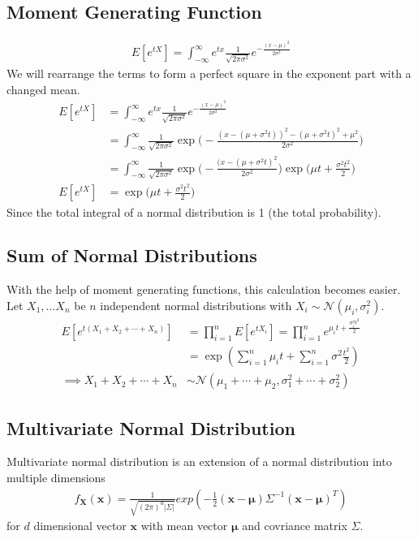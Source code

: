 \documentclass[../../probability-notes.tex]{subfiles}
\begin{document}
    \subsection{Moment Generating Function}
    \begin{align*}
        E[e^{tX}] = \int_{-\infty}^{\infty} e^{tx} \frac{1}{\sqrt{2\pi \sigma^{2}}} e^{-\frac{(x-\mu)^{2}}{2 \sigma^{2}}}
    \end{align*}
    We will rearrange the terms to form a perfect square in the exponent part with a changed mean.
    \begin{align*}
        E[e^{tX}] &= \int_{-\infty}^{\infty} e^{tx} \frac{1}{\sqrt{2\pi \sigma^{2}}} e^{-\frac{(x-\mu)^{2}}{2 \sigma^{2}}}\\
        &= \int_{-\infty}^{\infty}\frac{1}{\sqrt{2\pi \sigma^{2}}}\exp \bigg( -\frac{(x-(\mu+\sigma^{2}t))^{2} - (\mu+\sigma^{2}t)^{2} + \mu^{2}}{2 \sigma^{2}} \bigg)\\
        &= \int_{-\infty}^{\infty}\frac{1}{\sqrt{2\pi \sigma^{2}}} \exp \bigg(-\frac{(x-(\mu+\sigma^{2}t)^{2}}{2 \sigma^{2}} \bigg) \exp \bigg(\mu t + \frac{\sigma^{2} t^{2}}{2} \bigg)\\
        E[e^{tX}] &= \exp \bigg(\mu t + \frac{\sigma^{2} t^{2}}{2}\bigg)
    \end{align*}
    Since the total integral of a normal distribution is 1 (the total probability).

    \subsection{Sum of Normal Distributions}
    With the help of moment generating functions, this calculation becomes easier. Let $X_{1}, \ldots X_{n}$ be $n$ independent normal distributions with $X_{i} \sim \mathcal{N}(\mu_{i}, \sigma^{2}_{i})$.
    \begin{align*}
        E[e^{t(X_{1} + X_{2} + \cdots + X_{n})}] &= \prod_{i=1}^{n} E[e^{tX_{i}}] = \prod_{i=1}^{n} e^{\mu_{i} t + \frac{\sigma_{i}^{2} t^{2}}{2}}\\
        &= \exp(\sum_{i=1}^{n} \mu_{i} t+ \sum_{i=1}^{n}\sigma^{2} \frac{t^{2}}{2})\\
        \implies X_{1} + X_{2} + \cdots + X_{n} &\sim \mathcal{N}(\mu_{1} + \cdots + \mu_{2}, \sigma_{1}^{2} + \cdots + \sigma_{2}^{2})
    \end{align*}

    \subsection{Multivariate Normal Distribution}
    Multivariate normal distribution is an extension of a normal distribution into multiple dimensions
    \begin{align*}
        f_{\mathbf{X}}(\bm{x}) = \frac{1}{\sqrt{(2\pi)^{d} \lvert \Sigma \rvert}} exp(-\frac{1}{2}(\mathbf{x} - \bm{\mu})\Sigma^{-1}(\mathbf{x} - \bm{\mu})^{T})
    \end{align*}
    for $d$ dimensional vector $\mathbf{x}$ with mean vector $\bm{\mu}$ and covriance matrix $\Sigma$.
\end{document}
